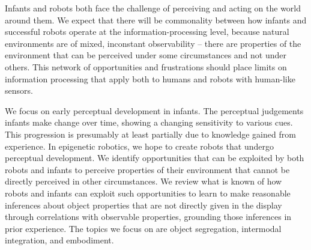 
Infants and robots both face the challenge of perceiving and acting on
the world around them.  
%
%
%
We expect
that there will be commonality between how infants and successful
robots operate at the information-processing level, because natural
environments are of mixed, inconstant observability -- there are
properties of the environment that can be perceived under some
circumstances and not under others.  This network of opportunities and
frustrations should place limits on information processing that apply
both to humans and robots with human-like sensors.

We focus on early perceptual development in infants.  The
perceptual judgements infants make change over time, showing
a changing sensitivity to various cues. This progression
is presumably at least partially due to knowledge gained
from experience.  In epigenetic robotics, we hope to 
create robots that undergo perceptual development.
%
%
%
We identify opportunities that can be exploited by both robots and
infants to perceive properties of their environment that cannot be
directly perceived in other circumstances.  We review what is known of
how robots and infants can exploit such opportunities to learn to make
reasonable inferences 
%
%
about object properties that are not directly given in the display
%
through correlations
with observable properties, grounding those inferences in prior
experience.
%
The topics we focus on are object segregation,
intermodal integration, and embodiment.








